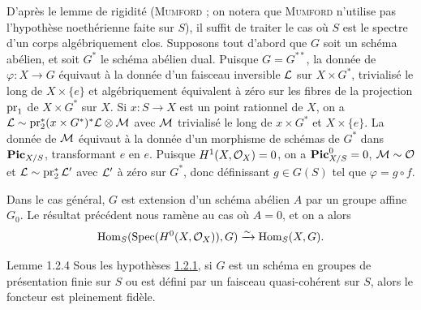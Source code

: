 \documentclass[10pt]{../fichiers-configuration-latex/smfart}
\begin{document}
D'après le lemme de rigidité (\textsc{Mumford} \cite[6.1. p.~115]{SGA4-18:4} ;
on notera que
\textsc{Mumford} n'utilise pas l'hypothèse noethérienne faite sur $S$), il
suffit de traiter le cas où $S$ est le spectre d'un corps
algébriquement clos. Supposons tout d'abord que $G$ soit un schéma
abélien, et soit $G^{\ast}$ le schéma abélien dual. Puisque
$G=G^{{\ast}{\ast}}$, la donnée de $\varphi:X\rightarrow G$ équivaut à
la donnée d'un faisceau inversible ${\mathcal L}$ sur $X\times
G^{\ast}$, trivialisé le long de $X\times \{e\}$ et algébriquement
équivalent à zéro sur les fibres de la projection
$\operatorname{pr}_{1}$ de $X\times G^{\ast}$ sur $X$. Si $x:S\to X$ est un point
rationnel de $X$, on a
${\mathcal L}\sim  \operatorname{pr}^{\ast}_{2}(x\times G^\ast)^{\ast}{\mathcal L}\otimes {\mathcal M}$ avec
${\mathcal M}$ trivialisé le long de $x\times G^{\ast}$ et $X\times
\{e\}$. La donnée de ${\mathcal M}$ équivaut à la donnée d'un morphisme
de schémas de $G^{\ast}$ dans $\operatorname{\mathbf{Pic}}_{X/S}$, transformant $e$ en
$e$. Puisque $H^{1}(X,{\mathcal O}_{X})=0$, on a $\operatorname{\mathbf{Pic}}^0_{X/S}=0$,
${\mathcal M}\sim{\mathcal O}$ et ${\mathcal L}\sim
\operatorname{pr}^{\ast}_{2}{\mathcal L}'$ avec ${\mathcal L}'$ 
à zéro sur
$G^{\ast}$, donc définissant $g\in G(S)$ tel que $\varphi=g\circ f$.

Dans le cas général, $G$ est extension d'un schéma abélien $A$ par un
groupe affine $G_0$. Le résultat précédent nous ramène au cas où
$A=0$, et on a alors
$$
\operatorname{Hom}_{S}(\operatorname{Spec} (H^0(X,{\mathcal O}_{X})),G)\xrightarrow{\sim}
\operatorname{Hom}_{S}(X,G){}.
$$

\begin{enonce*}{Lemme 1.2.4}
Sous les hypothèses \hyperref[XVIII.subsubsec1.2.1]{1.2.1}, si $G$ est un schéma
en groupes de présentation finie sur $S$ ou est défini par un faisceau
quasi-cohérent sur $S$, alors le foncteur  est
pleinement fidèle. 
\end{enonce*}
\end{document}
